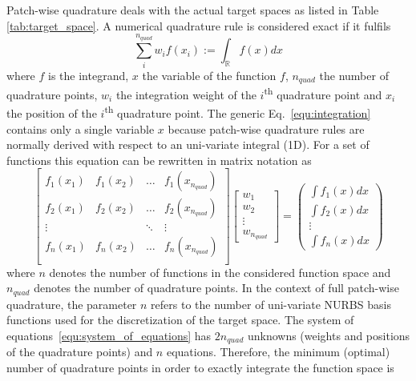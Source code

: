 \documentclass[3p]{elsarticle}
\begin{document}
Patch-wise quadrature deals with the actual target spaces as listed in Table \ref{tab:target_space}. A numerical quadrature rule is considered exact if it fulfils
\begin{equation}\label{equ:integration}
	\sum_i^{n_{quad}} w_i f(x_i) := \int_{\mathbb{R}} f(x) dx
\end{equation}
where $f$ is the integrand, $x$ the variable of the function $f$, $n_{quad}$ the number of quadrature points, $w_i$ the integration weight of the $i$\textsuperscript{th} quadrature point and $x_i$ the position of the $i$\textsuperscript{th} quadrature point. The generic Eq.~\eqref{equ:integration} contains only a single variable $x$ because patch-wise quadrature rules are normally derived with respect to an uni-variate integral (1D). For a set of functions this equation can be rewritten in matrix notation as
\begin{equation}\label{equ:system_of_equations}
	\left[\begin{array}{cccc}
		f_1(x_1) &f_1(x_2) &\hdots &f_1(x_{n_{quad}}) \\
		f_2(x_1) &f_2(x_2) &\hdots &f_2(x_{n_{quad}}) \\
		\vdots & &\ddots &\vdots \\
		f_n(x_1) &f_n(x_2) &\hdots &f_n(x_{n_{quad}}) \\
	\end{array}\right] \left[\begin{array}{c}
		w_1 \\
		w_2 \\
		\vdots \\
		w_{n_{quad}}
	\end{array}\right] = 	
	\left(\begin{array}{c}
	\int f_1(x)dx \\
	\int f_2(x)dx \\
	\vdots \\
	\int f_n(x)dx
\end{array}\right)
\end{equation}
where $n$ denotes the number of functions in the considered function space and $n_{quad}$ denotes the number of quadrature points. In the context of full patch-wise quadrature, the parameter $n$ refers to the number of uni-variate NURBS basis functions used for the discretization of the target space. The system of equations~\eqref{equ:system_of_equations} has $2n_{quad}$ unknowns (weights and positions of the quadrature points) and $n$ equations. Therefore, the minimum (optimal) number of quadrature points in order to exactly integrate the function space is
\end{document}
